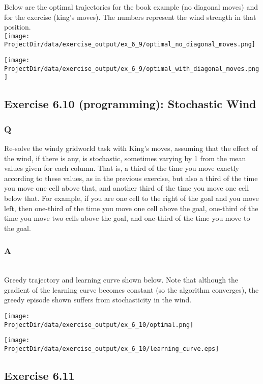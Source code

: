 Below are the optimal trajectories for the book example (no diagonal moves) and for the exercise (king's moves). The numbers represent the wind strength in that position.\\

\texttt{[image: \\ProjectDir/data/exercise\_output/ex\_6\_9/optimal\_no\_diagonal\_moves.png]}

\texttt{[image: \\ProjectDir/data/exercise\_output/ex\_6\_9/optimal\_with\_diagonal\_moves.png]}



\subsection{Exercise 6.10 (programming): Stochastic Wind}
\subsubsection{Q}
Re-solve the windy gridworld task with King’s moves, assuming that the effect of the wind, if there is any, is stochastic, sometimes varying by 1 from the mean values given for each column. That is, a third of the time you move exactly according to these values, as in the previous exercise, but also a third of the time you move one cell above that, and another third of the time you move one cell below that. For example, if you are one cell to the right of the goal and you move left, then one-third of the time you move one cell above the goal, one-third of the time you move two cells above the goal, and one-third of the time you move to the goal.

\subsubsection{A}
\ProgrammingExercise\\

Greedy trajectory and learning curve shown below. Note that although the gradient of the learning curve becomes constant (so the algorithm converges), the greedy episode shown suffers from stochasticity in the wind.

\texttt{[image: \\ProjectDir/data/exercise\_output/ex\_6\_10/optimal.png]}

\texttt{[image: \\ProjectDir/data/exercise\_output/ex\_6\_10/learning\_curve.eps]}

\subsection{Exercise 6.11}
